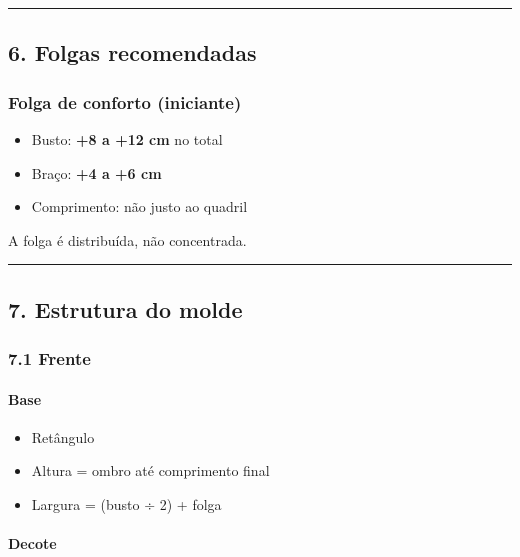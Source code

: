 \documentclass[
  10pt,oneside]{article}
\providecommand{\tightlist}{%
  \setlength{\itemsep}{0pt}\setlength{\parskip}{0pt}}
\begin{document}
\begin{center}\rule{0.5\linewidth}{0.5pt}\end{center}

\subsection{6. Folgas recomendadas}\label{folgas-recomendadas}

\subsubsection{Folga de conforto (iniciante)}\label{folga-de-conforto-iniciante}

\begin{itemize}
\tightlist
\item
  Busto: \textbf{+8 a +12 cm} no total
\item
  Braço: \textbf{+4 a +6 cm}
\item
  Comprimento: não justo ao quadril
\end{itemize}

A folga é distribuída, não concentrada.

\begin{center}\rule{0.5\linewidth}{0.5pt}\end{center}

\subsection{7. Estrutura do molde}\label{estrutura-do-molde}

\subsubsection{7.1 Frente}\label{frente}

\paragraph{Base}\label{base}

\begin{itemize}
\tightlist
\item
  Retângulo
\item
  Altura = ombro até comprimento final
\item
  Largura = (busto ÷ 2) + folga
\end{itemize}

\paragraph{Decote}\label{decote}
\end{document}
